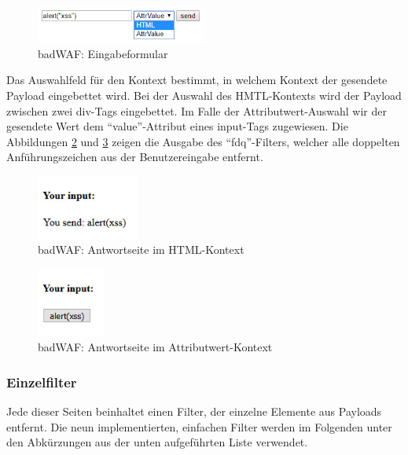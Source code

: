 \begin{figure}[htp] 
	\centering
	\includegraphics[width=0.5\textwidth]{contents/images/BadWAFTestFormInputs}
	\caption{badWAF: Eingabeformular}
	\label{fig:BadWAFTestFormInputs}
\end{figure}

Das Auswahlfeld für den Kontext bestimmt, in welchem Kontext der gesendete Payload eingebettet wird. Bei der Auswahl des HMTL-Kontexts wird der Payload zwischen zwei div-Tags eingebettet. Im Falle der Attributwert-Auswahl wir der gesendete Wert dem ``value''-Attribut eines input-Tags zugewiesen. Die Abbildungen \ref{fig:BadWAFResultFilterHTML} und \ref{fig:BadWAResultFilterAttrVal} zeigen die Ausgabe des ``fdq''-Filters, welcher alle doppelten Anführungszeichen aus der Benutzereingabe entfernt.

\begin{figure}[htp] 
	\centering
	\includegraphics[width=0.3\textwidth]{contents/images/BadWAFResultFilterHTML}
	\caption{badWAF: Antwortseite im HTML-Kontext}
	\label{fig:BadWAFResultFilterHTML}
\end{figure}

\begin{figure}[htp] 
	\centering
	\includegraphics[width=0.2\textwidth]{contents/images/BadWAResultFilterAttrVal}
	\caption{badWAF: Antwortseite im Attributwert-Kontext}
	\label{fig:BadWAResultFilterAttrVal}
\end{figure}

\FloatBarrier
\subsubsection{Einzelfilter}
Jede dieser Seiten beinhaltet einen Filter, der einzelne Elemente aus Payloads entfernt. Die neun implementierten, einfachen Filter werden im Folgenden unter den Abkürzungen aus der unten aufgeführten Liste verwendet.


